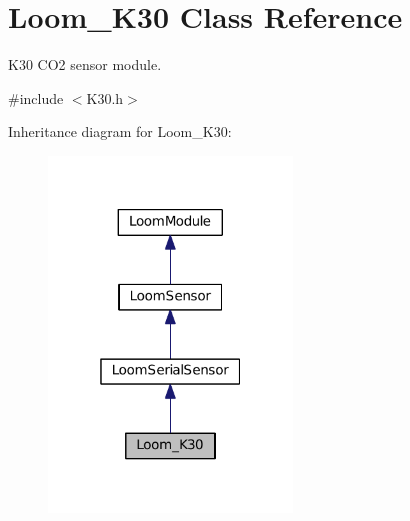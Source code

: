 \hypertarget{class_loom___k30}{}\section{Loom\+\_\+\+K30 Class Reference}
\label{class_loom___k30}


K30 C\+O2 sensor module.  




{\ttfamily \#include $<$K30.\+h$>$}



Inheritance diagram for Loom\+\_\+\+K30\+:\nopagebreak
\begin{figure}[H]
\begin{center}
\leavevmode
\includegraphics[width=184pt]{class_loom___k30__inherit__graph}
\end{center}
\end{figure}
